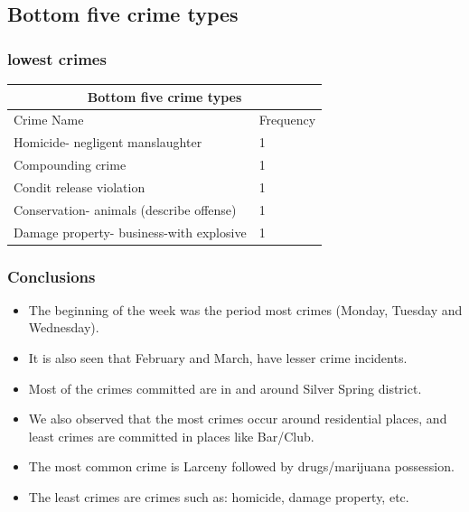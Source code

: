 \documentclass[usenames,dvipsnames]{beamer}
\begin{document}
\subsection{Bottom five crime types}
\begin{frame}
\frametitle{lowest crimes}

\begin{tabular}{ |l|l| }
  \hline
  \multicolumn{2}{|c|}{Bottom five crime types} \\
  \hline
  Crime Name & Frequency \\
  \hline
  Homicide- negligent manslaughter & 1 \\
  Compounding crime & 1 \\
  Condit release violation & 1 \\
  Conservation- animals (describe offense) & 1 \\
  Damage property- business-with explosive & 1 \\
  \hline
  \end{tabular}

\end{frame}
\begin{frame}
\frametitle{Conclusions}

\begin{itemize}
\item The beginning of the week was  the period most crimes (Monday, Tuesday and Wednesday). 
\item It is also seen  that February and March, have lesser crime incidents.
\item Most of the crimes committed are in and around Silver Spring district.
\item We also observed that the most crimes occur around residential places, and least crimes are committed in places like Bar/Club.
\item The most common crime is Larceny followed by drugs/marijuana possession.
\item The least crimes are crimes such as: homicide, damage property, etc.
\end{itemize}
\end{frame}
\end{document}
